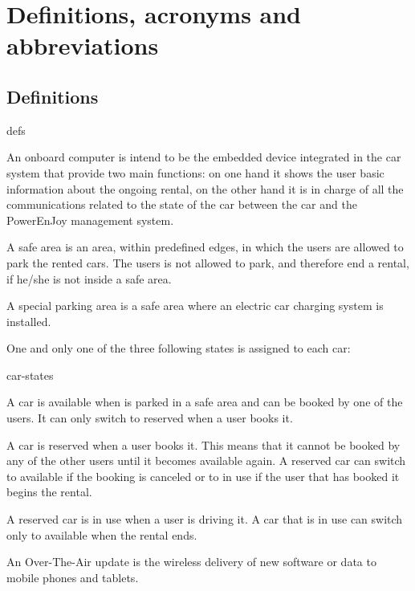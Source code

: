 \section{Definitions, acronyms and abbreviations}

\subsection{Definitions}
	\begin{labeling}{defs}
		\item[\textbf{Onboard computer}] An onboard computer is intend to be the embedded device integrated in the car system that provide two main functions: on one hand it shows the user basic information about the ongoing rental, on the other hand it is in charge of all the communications related to the state of the car between the car and the PowerEnJoy management system.
		\item[\textbf{Safe area}] A safe area is an area, within predefined edges, in which the users are allowed to park the rented cars. The users is not allowed to park, and therefore end a rental, if he/she is not inside a safe area.
		\item[\textbf{Special parking area}] A special parking area is a safe area where an electric car charging system is installed.
		\item[\textbf{Car states}] One and only one of the three following states is assigned to each car:
			\begin{labeling}{car-states}
				\item[\textbf{Available}] A car is available when is parked in a safe area and can be booked by one of the users. It can only switch to reserved when a user books it.
				\item[\textbf{Reserved}] A car is reserved when a user books it. This means that it cannot be booked by any of the other users until it becomes available again. A reserved car can switch to available if the booking is canceled or to in use if the user that has booked it begins the rental.
				\item[\textbf{In use}] A reserved car is in use when a user is driving it. A car that is in use can switch only to available when the rental ends.
			\end{labeling}
		\item[\textbf{Over-The-Air updates}] An Over-The-Air update is the wireless delivery of new software or data to mobile phones and tablets.
	\end{labeling}

